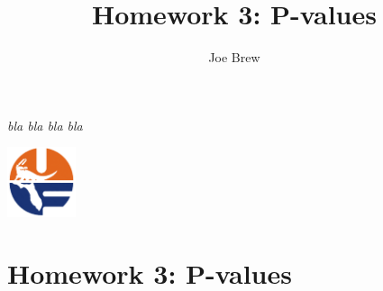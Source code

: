 \documentclass[11pt]{article}
\begin{document}


\title{\textbf{Homework 3: P-values}}
\author{Joe Brew}


\maketitle

\emph{bla bla bla bla}

\tableofcontents

\vspace{20mm}

\begin{center}
\includegraphics[width=2cm]{uf}
\end{center}




\section*{Homework 3: P-values}
\hrulefill
\end{document}
